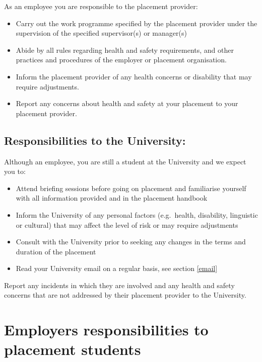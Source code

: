 \documentclass[
]{book}
\providecommand{\tightlist}{%
  \setlength{\itemsep}{0pt}\setlength{\parskip}{0pt}}
\begin{document}
As an employee you are responsible to the placement provider:

\begin{itemize}
\tightlist
\item
  Carry out the work programme specified by the placement provider under the supervision of the specified supervisor(s) or manager(s)
\item
  Abide by all rules regarding health and safety requirements, and other practices and procedures of the employer or placement organisation.
\item
  Inform the placement provider of any health concerns or disability that may require adjustments.
\item
  Report any concerns about health and safety at your placement to your placement provider.
\end{itemize}

\section{Responsibilities to the University:}\label{responsibilities-to-the-university}

Although an employee, you are still a student at the University and we expect you to:

\begin{itemize}
\tightlist
\item
  Attend briefing sessions before going on placement and familiarise yourself with all information provided and in the placement handbook
\item
  Inform the University of any personal factors (e.g.~health, disability, linguistic or cultural) that may affect the level of risk or may require adjustments
\item
  Consult with the University prior to seeking any changes in the terms and duration of the placement
\item
  Read your University email on a regular basis, see section \ref{email}
\end{itemize}

Report any incidents in which they are involved and any health and safety concerns that are not addressed by their placement provider to the University.

\chapter{Employers responsibilities to placement students}\label{employers}
\end{document}
